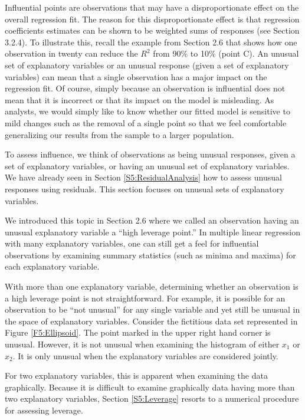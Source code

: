 Influential points are observations that may have a disproportionate
effect on the overall regression fit. The reason for this
disproportionate effect is that regression coefficients estimates
can be shown to be weighted sums of responses (see Section 3.2.4).
To illustrate this, recall the example from Section 2.6 that shows
how one observation in twenty can reduce the $R^{2}$ from 90\% to
10\% (point C). An unusual set of explanatory variables or an
unusual response (given a set of explanatory variables) can mean
that a single observation has a major impact on the regression fit.
Of course, simply because an observation is influential does not
mean that it is incorrect or that its impact on the model is
misleading. As analysts, we would simply like to know whether our
fitted model is sensitive to mild changes such as the removal of a
single point so that we feel comfortable generalizing our results
from the sample to a larger population.

To assess influence, we think of observations as being unusual
responses, given a set of explanatory variables, or having an
unusual set of explanatory variables. We have already seen in
Section \ref{S5:ResidualAnalysis} how to assess unusual responses
using residuals. This section focuses on unusual sets of explanatory
variables.

We introduced this topic in Section 2.6 where we called an
observation having an unusual explanatory variable a ``high leverage
point.'' In multiple linear regression with many explanatory
variables, one can still get a feel for influential observations by
examining summary statistics (such as minima and maxima) for each
explanatory variable.


With more than one explanatory variable, determining whether an
observation is a high leverage point is not straightforward. For
example, it is possible for an observation to be ``not unusual'' for
any single variable and yet still be unusual in the space of
explanatory variables. Consider the fictitious data set represented
in Figure \ref{F5:Ellipsoid}. The point marked in the upper right
hand corner is unusual. However, it is not unusual when examining
the histogram of either $x_{1}$ or $x_{2}$. It is only unusual when
the explanatory variables are considered jointly.

For two explanatory variables, this is apparent when examining the
data graphically. Because it is difficult to examine graphically
data having more than two explanatory variables, Section
\ref{S5:Leverage} resorts to a numerical procedure for assessing
leverage.


